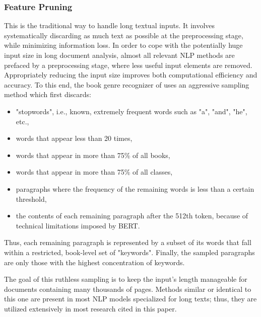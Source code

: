 \documentclass[preprint,review,12pt]{elsarticle}
\begin{document}
\subsubsection{Feature Pruning}

This is the traditional way to handle long textual inputs. It involves systematically discarding as much text as possible at the preprocessing stage, while minimizing information loss. In order to cope with the potentially huge input size in long document analysis, almost all relevant NLP methods are prefaced by a preprocessing stage, where less useful input elements are removed. Appropriately reducing the input size improves both computational efficiency and accuracy. To this end, the book genre recognizer of \citet{sicong} uses an aggressive sampling method which first discards:

\begin{itemize}
    \item "stopwords", i.e., known, extremely frequent words such as "a", "and", "he", etc.,
    \item words that appear less than 20 times,
    \item words that appear in more than 75\% of all books,
    \item words that appear in more than 75\% of all classes,
    \item paragraphs where the frequency of the remaining words is less than a certain threshold,
    \item the contents of each remaining paragraph after the 512th token, because of technical limitations imposed by BERT.
\end{itemize}

Thus, each remaining paragraph is represented by a subset of its words that fall within a restricted, book-level set of "keywords". Finally, the sampled paragraphs are only those with the highest concentration of keywords. 

The goal of this ruthless sampling is to keep the input's length manageable for documents containing many thousands of pages. Methods similar or identical to this one are present in most NLP models specialized for long texts; thus, they are utilized extensively in most research cited in this paper.
\end{document}
